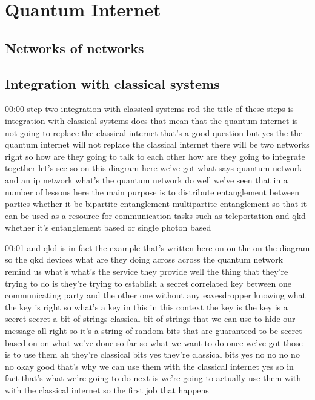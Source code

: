 \chapter{Quantum Internet}

\section{Networks of networks}


\section{Integration with classical systems}
\label{sec:classical-integration}

00:00
step two integration with classical systems rod the title of these steps is
integration with classical systems does that mean that the quantum internet
is not going to replace the classical internet
that's a good question but yes the the quantum internet will not replace the
classical internet there will be two networks right so how are they going to
talk to each other how are they going to integrate together
let's see so on this diagram here we've got what says quantum network and an ip
network what's the quantum network do well we've seen that in a number of
lessons here the main purpose is to distribute
entanglement between parties whether it be bipartite entanglement multipartite
entanglement so that it can be used as a resource for
communication tasks such as teleportation
and qkd whether it's entanglement based or single photon based

00:01
and qkd is in fact the example that's written here on on the on the diagram so
the qkd devices what are they doing across across the quantum network remind
us what's what's the service they provide well the
thing that they're trying to do is they're trying to establish a secret
correlated key between one communicating party and the other one
without any eavesdropper knowing what the key is right so what's a key in this
in this context the key is the key is a secret secret a bit of strings
classical bit of strings that we can use to hide our message
all right so it's a string of random bits that are guaranteed to be
secret based on on what we've done so far so what we want to do once we've got
those is to use them ah they're classical bits yes they're classical bits yes
no no no no no okay good that's why we can use them with the classical internet
yes so in fact that's what we're going to do next is we're going to actually
use them with with the classical internet so the first job that happens

